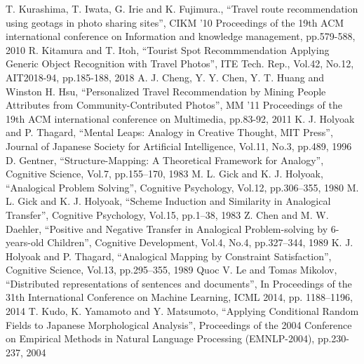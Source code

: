 \documentclass{deimj}
\begin{document}
\vspace{2em}
\begin{thebibliography}{99}
    T. Kurashima, T. Iwata, G. Irie and K. Fujimura.,
      ``Travel route recommendation using geotags in photo sharing sites'',
      CIKM '10 Proceedings of the 19th ACM international conference on Information and knowledge management, pp.579-588, 2010
    R. Kitamura and T. Itoh,
      ``Tourist Spot Recommmendation Applying Generic Object Recognition with Travel Photos'',
      ITE Tech. Rep., Vol.42, No.12, AIT2018-94, pp.185-188, 2018
    A. J. Cheng, Y. Y. Chen, Y. T. Huang and Winston H. Hsu,
      ``Personalized Travel Recommendation by Mining People Attributes from Community-Contributed Photos'',
      MM '11 Proceedings of the 19th ACM international conference on Multimedia, pp.83-92, 2011
    K. J. Holyoak and P. Thagard,
      ``Mental Leaps: Analogy in Creative Thought, MIT Press'',
      Journal of Japanese Society for Artificial Intelligence,  Vol.11, No.3,  pp.489, 1996
    D. Gentner,
      ``Structure-Mapping: A Theoretical Framework for Analogy'',
      Cognitive Science, Vol.7, pp.155–170, 1983
    M. L. Gick and K. J. Holyoak,
      ``Analogical Problem Solving'',
      Cognitive Psychology, Vol.12, pp.306–355, 1980
    M. L. Gick and K. J. Holyoak,
      ``Scheme Induction and Similarity in Analogical Transfer'',
      Cognitive Psychology, Vol.15, pp.1–38, 1983
    Z. Chen and M. W. Daehler,
      ``Positive and Negative Transfer in Analogical Problem-solving by 6-years-old Children'',
      Cognitive Development, Vol.4, No.4, pp.327–344, 1989
    K. J. Holyoak and P. Thagard,
      ``Analogical Mapping by Constraint Satisfaction'',
      Cognitive Science, Vol.13, pp.295–355, 1989
    Quoc V. Le and Tomas Mikolov,
      ``Distributed representations of sentences and documents'',
      In Proceedings of the 31th International Conference on Machine Learning, ICML 2014, pp. 1188–1196, 2014
    T. Kudo, K. Yamamoto and Y. Matsumoto,
      ``Applying Conditional Random Fields to Japanese Morphological Analysis'',
      Proceedings of the 2004 Conference on Empirical Methods in Natural Language Processing (EMNLP-2004), pp.230-237, 2004
\end{thebibliography}
\end{document}
